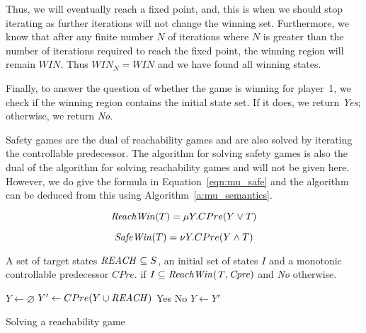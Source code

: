 Thus, we will eventually reach a fixed point, and, this is when we should stop iterating as further iterations will not change the winning set. Furthermore, we know that after any finite number $N$ of iterations where $N$ is greater than the number of iterations required to reach the fixed point, the winning region will remain $WIN$. Thus $WIN_N = WIN$ and we have found all winning states.

Finally, to answer the question of whether the game is winning for player~1, we check if the winning region contains the initial state set. If it does, we return \emph{Yes}; otherwise, we return \emph{No}.

Safety games are the dual of reachability games and are also solved by iterating the controllable predecessor. The algorithm for solving safety games is also the dual of the algorithm for solving reachability games and will not be given here. However, we do give the \mucalc formula in Equation~\ref{eqn:mu_safe} and the algorithm can be deduced from this using Algorithm~\ref{a:mu_semantics}.

\begin{equation}
    \mathit{ReachWin}(T) = \mu Y. CPre(Y \vee T)
\label{eqn:mu_reach}
\end{equation}

\begin{equation}
\mathit{SafeWin}(T) = \nu Y. CPre(Y \wedge T)
\label{eqn:mu_safe}
\end{equation}

\begin{algorithm}[t]
\begin{algorithmic}

\Require A set of target states $\mathit{REACH} \subseteq S$, an initial set of states $I$ and a monotonic controllable predecessor $CPre$.
 if $I \subseteq \mathit{ReachWin(T, Cpre)}$ and {\it No} otherwise.

    \State $Y \gets \varnothing$
    \Loop
        \State $Y' \gets CPre(Y \cup \mathit{REACH})$
                \State\Return Yes
            \Else
                \State\Return No
            \EndIf
        \EndIf
        \State $Y \gets Y'$
    \EndLoop
\EndFunction

\end{algorithmic}
\caption{Solving a reachability game}
\label{a:reach}
\end{algorithm}

